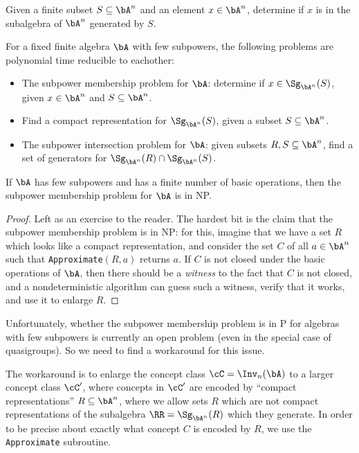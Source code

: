 \begin{prob}\label{subpower-membership} Given a finite subset $S \subseteq \bA^n$ and an element $x \in \bA^n$, determine if $x$ is in the subalgebra of $\bA^n$ generated by $S$.
\end{prob}

\begin{thm} For a fixed finite algebra $\bA$ with few subpowers, the following problems are polynomial time reducible to eachother:
\begin{itemize}
\item The subpower membership problem for $\bA$: determine if $x \in \Sg_{\bA^n}(S)$, given $x \in \bA^n$ and $S \subseteq \bA^n$.

\item Find a compact representation for $\Sg_{\bA^n}(S)$, given a subset $S \subseteq \bA^n$.

\item The subpower intersection problem for $\bA$: given subsets $R,S \subseteq \bA^n$, find a set of generators for $\Sg_{\bA^n}(R) \cap \Sg_{\bA^n}(S)$.
\end{itemize}
If $\bA$ has few subpowers and has a finite number of basic operations, then the subpower membership problem for $\bA$ is in NP.
\end{thm}
\begin{proof} Left as an exercise to the reader. The hardest bit is the claim that the subpower membership problem is in NP: for this, imagine that we have a set $R$ which looks like a compact representation, and consider the set $C$ of all $a \in \bA^n$ such that \texttt{Approximate}$(R,a)$ returns $a$. If $C$ is not closed under the basic operations of $\bA$, then there should be a \emph{witness} to the fact that $C$ is not closed, and a nondeterministic algorithm can guess such a witness, verify that it works, and use it to enlarge $R$.
\end{proof}

Unfortunately, whether the subpower membership problem is in P for algebras with few subpowers is currently an open problem (even in the special case of quasigroups). So we need to find a workaround for this issue.

The workaround is to enlarge the concept class $\cC = \Inv_n(\bA)$ to a larger concept class $\cC'$, where concepts in $\cC'$ are encoded by ``compact representations'' $R \subseteq \bA^n$, where we allow sets $R$ which are not compact representations of the subalgebra $\RR = \Sg_{\bA^n}(R)$ which they generate. In order to be precise about exactly what concept $C$ is encoded by $R$, we use the \texttt{Approximate} subroutine.

